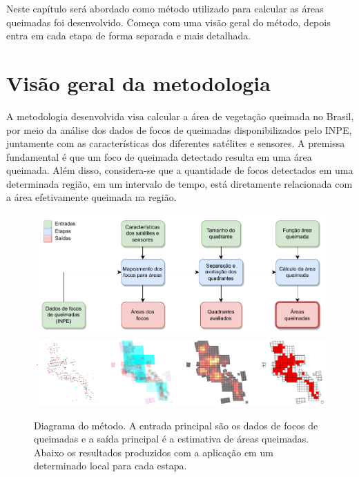 \documentclass[cic,tc]{iiufrgs}
\begin{document}
Neste capítulo será abordado como método utilizado para calcular as áreas queimadas foi desenvolvido. Começa com uma visão geral do método, depois entra em cada etapa de forma separada e mais detalhada.

\section{Visão geral da metodologia}

A metodologia desenvolvida visa calcular a área de vegetação queimada no Brasil, por meio da análise dos dados de focos de queimadas disponibilizados pelo INPE, juntamente com as características dos diferentes satélites e sensores. A premissa fundamental é que um foco de queimada detectado resulta em uma área queimada. Além disso, considera-se que a quantidade de focos detectados em uma determinada região, em um intervalo de tempo, está diretamente relacionada com a área efetivamente queimada na região. \par 

\begin{figure}[H]
    \caption{Diagrama do método. A entrada principal são os dados de focos de queimadas e a saída principal é a estimativa de áreas queimadas. Abaixo os resultados produzidos com a aplicação em um determinado local para cada estapa.}
    \begin{center}
        \includegraphics[width=35em]{metodologica_workflow}
        \includegraphics[width=35em]{exemplo_metodo_completo}
    \end{center}
    \label{fig:metodologica_workflow}
\end{figure}
\end{document}
